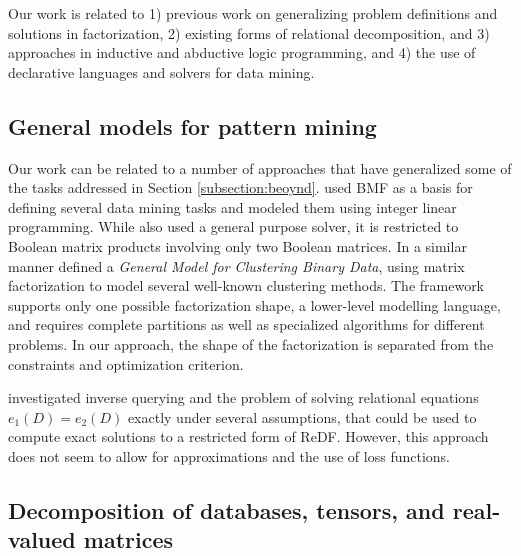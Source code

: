 \label{sec:relwork}
Our work is related to 1) previous work on generalizing problem definitions and solutions in factorization, 2) existing forms of relational decomposition, and 3) approaches in inductive and abductive logic programming, and 4) the use of declarative languages and solvers for data mining.



\subsection{General models for pattern mining} 
Our work can be related to a number of approaches that have generalized some of the tasks addressed in Section \ref{subsection:beoynd}.  
\cite{optimalBMFroles} used BMF as a basis for defining several data mining tasks and modeled them using  integer linear programming. 
While \cite{optimalBMFroles} also used a general purpose solver, it is restricted to Boolean matrix products involving only two Boolean matrices. 
In a similar manner \cite{generalClustering} defined a \textit{General Model for Clustering Binary Data}, using matrix factorization to model several well-known clustering methods.  The framework supports only one possible factorization shape, a lower-level modelling language, and requires complete partitions as well as specialized algorithms for different problems. In our approach, the shape of the factorization is separated from the constraints and optimization criterion.



\cite{solvingrelationalequations, journals/is/FanGZ12} investigated inverse querying and the problem of solving relational equations $e_1(D) = e_2(D)$ exactly under several assumptions, that could be used to compute exact solutions to a restricted form of ReDF. However, this approach does not seem to allow for approximations and the use of loss functions. 




\subsection{Decomposition of databases, tensors, and real-valued matrices} 

